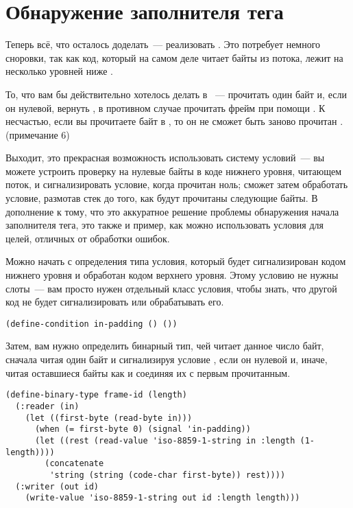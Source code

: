 \section{Обнаружение заполнителя тега}

Теперь всё, что осталось доделать~--- реализовать . Это потребует немного
сноровки, так как код, который на самом деле читает байты из потока, лежит на несколько
уровней ниже .

То, что вам бы действительно хотелось делать в ~--- прочитать один байт и,
если он нулевой, вернуть , в противном случае прочитать фрейм при помощи
. К несчастью, если вы прочитаете байт в , то он не
сможет быть заново прочитан .(примечание 6)

Выходит, это прекрасная возможность использовать систему условий~--- вы можете устроить
проверку на нулевые байты в коде нижнего уровня, читающем поток, и сигнализировать
условие, когда прочитан ноль;  сможет затем обработать условие, размотав
стек до того, как будут прочитаны следующие байты. В дополнение к тому, что это аккуратное
решение проблемы обнаружения начала заполнителя тега, это также и пример, как можно
использовать условия для целей, отличных от обработки ошибок.

Можно начать с определения типа условия, который будет сигнализирован кодом нижнего уровня
и обработан кодом верхнего уровня. Этому условию не нужны слоты~--- вам просто нужен
отдельный класс условия, чтобы знать, что другой код не будет сигнализировать или
обрабатывать его.

\begin{lstlisting}
(define-condition in-padding () ())
\end{lstlisting}

Затем, вам нужно определить бинарный тип, чей  читает данное число байт,
сначала читая один байт и сигнализируя условие , если он нулевой и,
иначе, читая оставшиеся байты как  и соединяя их с первым
прочитанным.

\begin{lstlisting}
(define-binary-type frame-id (length)
  (:reader (in)
    (let ((first-byte (read-byte in)))
      (when (= first-byte 0) (signal 'in-padding))
      (let ((rest (read-value 'iso-8859-1-string in :length (1- length))))
        (concatenate
         'string (string (code-char first-byte)) rest))))
  (:writer (out id)
    (write-value 'iso-8859-1-string out id :length length)))
\end{lstlisting}

